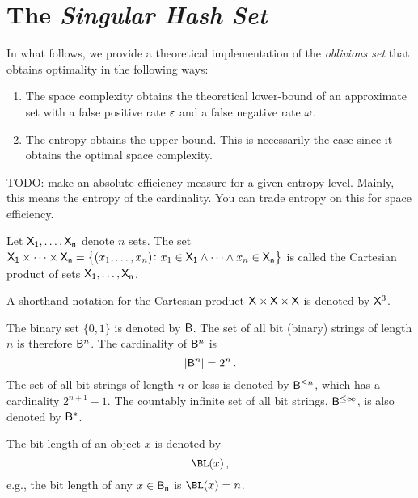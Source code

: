 \documentclass[ ../main.tex]{subfiles}
\begin{document}
\section{The \emph{Singular Hash Set}}
\label{sec:shs}
In what follows, we provide a theoretical implementation of the \emph{oblivious set} that obtains optimality in the following ways:
\begin{enumerate}
    \item The space complexity obtains the theoretical lower-bound of an approximate set with a false positive rate $\varepsilon$ and a false negative rate $\omega$.
    \item The entropy obtains the upper bound. This is necessarily the case since it obtains the optimal space complexity.
\end{enumerate}

TODO: make an absolute efficiency measure for a given entropy level. Mainly, this means the entropy of the cardinality. You can trade entropy on this for space efficiency.

\begin{definition}
Let $\Set{X}[1],\ldots,\Set{X}[n]$ denote $n$ sets. The set $\Set{X}[1] \times \cdots \times \Set{X}[n] = \left\{(x_1,\ldots,x_n) \colon x_1 \in \Set{X}[1] \land \cdots \land x_n \in \Set{X}[n]\right\}$ is called the Cartesian product of sets $\Set{X}[1],\ldots,\Set{X}[n]$.
\end{definition}
A shorthand notation for the Cartesian product $\Set{X} \times \Set{X} \times \Set{X}$ is denoted by $\Set{X}^3$.

The binary set $\{0,1\}$ is denoted by $\Set{B}$. The set of all bit (binary) strings of length $n$ is therefore $\Set{B}^n$. The cardinality of $\Set{B}^n$ is
\begin{equation}
    \Card{\Set{B}^n} = 2^n\,.
\end{equation}
The set of all bit strings of length $n$ or less is denoted by $\Set{B}^{\leq n}$, which has a cardinality $2^{n+1}-1$. The countably infinite set of all bit strings, $\Set{B}^{\leq \infty}$, is also denoted by $\Set{B}^{*}$.

The bit length of an object $x$ is denoted by
\begin{equation}
    \BL(x)\,,
\end{equation}
e.g., the bit length of any $x \in \Set{B}[n]$ is $\BL(x) = n$.
\end{document}
